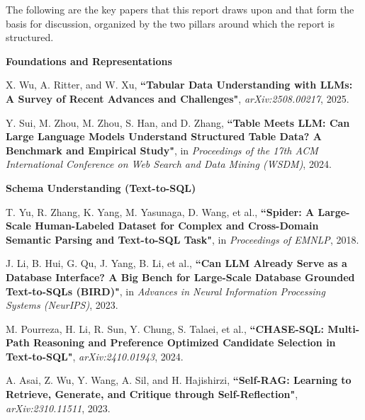 The following are the key papers that this report draws upon and that form the basis for discussion, organized by the two pillars around which the report is structured.

\vspace*{0.3cm}
\noindent\textbf{Foundations and Representations}
\begin{enumerate}[label={[S\arabic*]}]
    \item X. Wu, A. Ritter, and W. Xu, \textbf{``Tabular Data Understanding with LLMs: A Survey of Recent Advances and Challenges"}, {\it arXiv:2508.00217}, 2025.

    \item Y. Sui, M. Zhou, M. Zhou, S. Han, and D. Zhang, \textbf{``Table Meets LLM: Can Large Language Models Understand Structured Table Data? A Benchmark and Empirical Study"}, in {\it Proceedings of the 17th ACM International Conference on Web Search and Data Mining (WSDM)}, 2024.
\end{enumerate}

\vspace*{0.2cm}
\noindent\textbf{Schema Understanding (Text-to-SQL)}
\begin{enumerate}[start=3,label={[S\arabic*]}]
    \item T. Yu, R. Zhang, K. Yang, M. Yasunaga, D. Wang, et al., \textbf{``Spider: A Large-Scale Human-Labeled Dataset for Complex and Cross-Domain Semantic Parsing and Text-to-SQL Task"}, in {\it Proceedings of EMNLP}, 2018.

    \item J. Li, B. Hui, G. Qu, J. Yang, B. Li, et al., \textbf{``Can LLM Already Serve as a Database Interface? A Big Bench for Large-Scale Database Grounded Text-to-SQLs (BIRD)"}, in {\it Advances in Neural Information Processing Systems (NeurIPS)}, 2023.

    \item M. Pourreza, H. Li, R. Sun, Y. Chung, S. Talaei, et al., \textbf{``CHASE-SQL: Multi-Path Reasoning and Preference Optimized Candidate Selection in Text-to-SQL"}, {\it arXiv:2410.01943}, 2024.

    \item A. Asai, Z. Wu, Y. Wang, A. Sil, and H. Hajishirzi, \textbf{``Self-RAG: Learning to Retrieve, Generate, and Critique through Self-Reflection"}, {\it arXiv:2310.11511}, 2023.
\end{enumerate}

